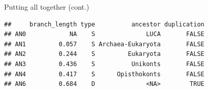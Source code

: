 \documentclass[9pt,handout,ignorenonframetext,]{beamer}
\newenvironment{Shaded}{\begin{snugshade}}{\end{snugshade}}
\newcommand{\KeywordTok}[1]{\textcolor[rgb]{0.94,0.87,0.69}{#1}}
\newcommand{\CommentTok}[1]{\textcolor[rgb]{0.50,0.62,0.50}{#1}}
\newcommand{\OperatorTok}[1]{\textcolor[rgb]{0.94,0.94,0.82}{#1}}
\newcommand{\NormalTok}[1]{\textcolor[rgb]{0.80,0.80,0.80}{#1}}
\begin{document}
\begin{frame}[fragile]{Putting all together (cont.)}

\footnotesize

\begin{Shaded}
\end{Shaded}

\begin{verbatim}
##     branch_length type          ancestor duplication
## AN0            NA    S              LUCA       FALSE
## AN1         0.057    S Archaea-Eukaryota       FALSE
## AN2         0.244    S         Eukaryota       FALSE
## AN3         0.436    S          Unikonts       FALSE
## AN4         0.417    S      Opisthokonts       FALSE
## AN6         0.684    D              <NA>        TRUE
\end{verbatim}

\normalsize

\end{frame}
\end{document}
